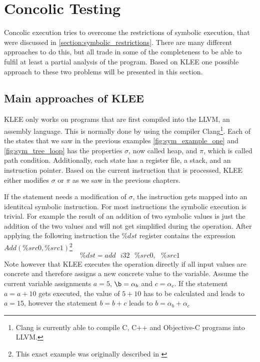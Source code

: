 \section{Concolic Testing} \label{section:concolic_testing}
Concolic execution tries to overcome the restrictions of symbolic execution, that were discussed in \ref{section:symbolic_restrictions}. There are many different approaches to do this, but all trade in some of the completeness to be able to fulfil at least a partial analysis of the program.
Based on KLEE \cite{Cadar:2008:KUA:1855741.1855756} one possible approach to these two problems will be presented in this section.

\subsection{Main approaches of KLEE}
KLEE only works on programs that are first compiled into the LLVM, an assembly language. This is normally done by using the compiler Clang\footnote{Clang is currently able to compile C, C++  and Objective-C programs into LLVM.}. 
Each of the states that we saw in the previous examples \ref{fig:sym_example_one} and \ref{fig:sym_tree_loop} has the properties $\sigma$, now called heap, and $\pi$, which is called path condition. Additionally, each state has a register file, a stack, and an instruction pointer. Based on the current instruction that is processed, KLEE either modifies $\sigma$ or $\pi$ as we saw in the previous chapters.

If the statement needs a modification of $\sigma$, the instruction gets mapped into an identitcal symbolic instruction. For most instructions the symbolic execution is trivial. For example the result of an addition of two symbolic values is just the addition of the two values and will not get simplified during the operation. After applying the following instruction the $\%dst$ register contains the expression $Add(\%src0, \%src1)$\footnote{This exact example was originally described in \cite{Cadar:2008:KUA:1855741.1855756}}
$$\%dst = add\text{ }i32\text{ }\%src0,\text{ }\%src1$$
Note however that KLEE executes the operation directly if all input values are concrete and therefore assigns a new concrete value to the variable.
Assume the current variable assignments $a = 5$, $\b = \alpha_b$ and $c=\alpha_c$. If the statement $a = a + 10$ gets executed, the value of $5 + 10$ has to be calculated and leads to $a = 15$, however the statement $b = b + c$ leads to $b = \alpha_b + \alpha_c$

